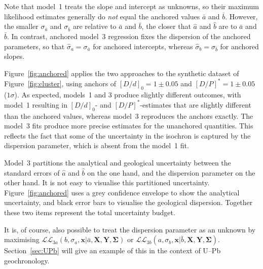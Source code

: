 \documentclass{article}
\begin{document}
Note that model~1 treats the slope and intercept as unknowns, so their
maximum likelihood estimates generally do \emph{not} equal the
anchored values $\bar{a}$ and $\bar{b}$. However, the smaller
$\sigma_{\bar{a}}$ and $\sigma_{\bar{b}}$ are relative to $\bar{a}$
and $\bar{b}$, the closer that $\hat{a}$ and $\hat{b}$ are to
$\bar{a}$ and $\bar{b}$. In contrast, anchored model~3 regression
fixes the dispersion of the anchored parameters, so that
$\hat{\sigma}_{a}=\sigma_{\bar{a}}$ for anchored intercepts, whereas
$\hat{\sigma}_{b}=\sigma_{\bar{b}}$ for anchored slopes.\medskip

Figure~\ref{fig:anchored} applies the two approaches to the synthetic
dataset of Figure~\ref{fig:cluster}, using anchors of $[D/d]_0 = 1 \pm
0.05$ and $[D/P]^\ast = 1 \pm 0.05$ ($1\sigma$). As expected, models~1
and 3 produce slightly different outcomes, with model~1 resulting in
$[D/d]_0$- and $[D/P]^\ast$-estimates that are slightly different than
the anchored values, whereas model~3 reproduces the anchors
exactly. The model~3 fits produce more precise estimates for the
unanchored quantities.  This reflects the fact that some of the
uncertainty in the isochron is captured by the dispersion parameter,
which is absent from the model~1 fit.\medskip

Model~3 partitions the analytical and geological uncertainty between
the standard errors of $\hat{a}$ and $\hat{b}$ on the one hand, and
the dispersion parameter on the other hand. It is not easy to
visualise this partitioned uncertainty. Figure~\ref{fig:anchored} uses
a grey confidence envelope to show the analytical uncertainty, and
black error bars to visualise the geological dispersion. Together
these two items represent the total uncertainty budget.\medskip

It is, of course, also possible to treat the dispersion parameter as
an unknown by maximising
$\mathcal{LL}_{3a}(b,\sigma_{a},\mathbf{x}|\bar{a},\mathbf{X},\mathbf{Y},\mathbf{\Sigma})$
or
$\mathcal{LL}_{3b}(a,\sigma_{b},\mathbf{x}|\bar{b},\mathbf{X},\mathbf{Y},\mathbf{\Sigma})$.
Section~\ref{sec:UPb} will give an example of this in the context of
U--Pb geochronology.
\end{document}
